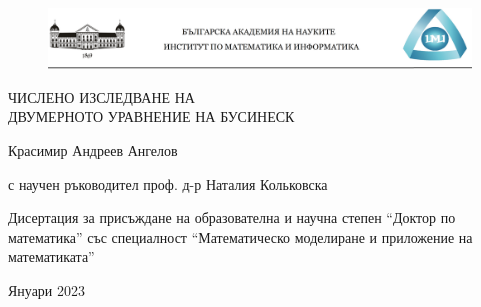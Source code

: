 \documentclass[a4paper]{article}
\theoremstyle{remark}
\begin{document}
\begin{large}

\thispagestyle{empty}
\begin{center}

  \begin{figure}[!htb]
      \includegraphics[width=1\linewidth]{LogoThesis.png}
  \end{figure}

\begin{minipage}{0.84\linewidth}
    \centering
    \vspace{2cm}
    {\Large ЧИСЛЕНО ИЗСЛЕДВАНЕ НА \\ДВУМЕРНОТО УРАВНЕНИЕ НА БУСИНЕСК\par}
    \vspace{2cm}
    {\Large Красимир Андреев Ангелов \par с научен ръководител проф. д-р Наталия Кольковска\par}
    \vspace{2cm}
    {\Large Дисертация за присъждане на образователна и научна степен ``Доктор по математика'' със специалност ``Математическо моделиране и приложение на математиката''\par}
    \vspace{5cm}
    {\Large Януари 2023}
\end{minipage}
\end{center}
\clearpage

\shipout\null


\tableofcontents
\newpage



\end{large}
\end{document}
